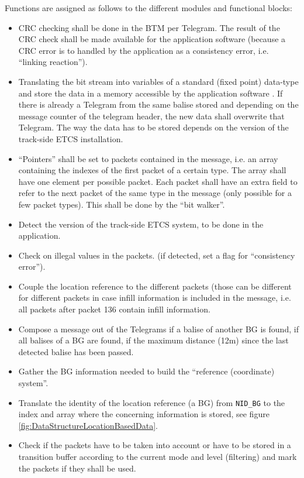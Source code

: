 Functions are assigned as follows to the different modules and functional blocks:
\begin{itemize}
\item CRC checking shall be done in the BTM per Telegram. The result of the CRC check shall be made available for the application software (because a CRC error is to handled by the application as a consistency error, i.e. “linking reaction”).
\item Translating the bit stream into variables of a standard (fixed point) data-type and store the data in a memory accessible by the application software . If there is already a Telegram from the same balise stored and depending on the message counter of the telegram header, the new data shall overwrite that Telegram. The way the data has to be stored depends on the version of the track-side ETCS installation.
\item “Pointers” shall be set to packets contained in the message, i.e. an array containing  the indexes of the first packet of a certain type. The array shall have one element per possible packet. Each packet shall have an extra field to refer to the next packet of the same type in the message (only possible for a few packet types).
This shall be done by the “bit walker”.
\item Detect the version of the track-side ETCS system, to be done in the application.
\item Check on illegal values in the packets. (if detected, set a flag for “consistency error”).
\item Couple the location reference to the different packets (those can be different for different packets in case infill information is included in the message, i.e. all packets after packet 136 contain infill information.
\item Compose a message out of the Telegrams if a balise of another BG is found, if all balises of a BG are found, if the maximum distance (12m) since the last detected balise has been passed.
\item Gather the BG information needed to build the “reference (coordinate) system”.
\item Translate the identity of the location reference (a BG) from \verb+NID_BG+ to the index and array where the concerning information is stored, see figure \ref{fig:DataStructureLocationBasedData}.
\item Check if the packets have to be taken into account or have to be stored in a transition buffer according to the current mode and level (filtering) and mark the packets if they shall be used.
\end{itemize}

